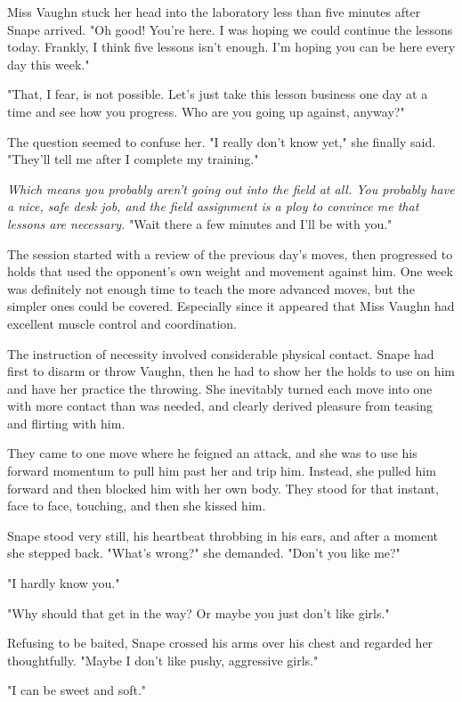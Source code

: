 Miss Vaughn stuck her head into the laboratory less than five minutes after Snape arrived. "Oh good! You're here. I was hoping we could continue the lessons today. Frankly, I think five lessons isn't enough. I'm hoping you can be here every day this week."

"That, I fear, is not possible. Let's just take this lesson business one day at a time and see how you progress. Who are you going up against, anyway?"

The question seemed to confuse her. "I really don't know yet," she finally said. "They'll tell me after I complete my training."

\emph{Which means you probably aren't going out into the field at all. You probably have a nice, safe desk job, and the field assignment is a ploy to convince me that lessons are necessary.} "Wait there a few minutes and I'll be with you."

The session started with a review of the previous day's moves, then progressed to holds that used the opponent's own weight and movement against him. One week was definitely not enough time to teach the more advanced moves, but the simpler ones could be covered. Especially since it appeared that Miss Vaughn had excellent muscle control and coordination.

The instruction of necessity involved considerable physical contact. Snape had first to disarm or throw Vaughn, then he had to show her the holds to use on him and have her practice the throwing. She inevitably turned each move into one with more contact than was needed, and clearly derived pleasure from teasing and flirting with him.

They came to one move where he feigned an attack, and she was to use his forward momentum to pull him past her and trip him. Instead, she pulled him forward and then blocked him with her own body. They stood for that instant, face to face, touching, and then she kissed him.

Snape stood very still, his heartbeat throbbing in his ears, and after a moment she stepped back. "What's wrong?" she demanded. "Don't you like me?"

"I hardly know you."

"Why should that get in the way? Or maybe you just don't like girls."

Refusing to be baited, Snape crossed his arms over his chest and regarded her thoughtfully. "Maybe I don't like pushy, aggressive girls."

"I can be sweet and soft."

